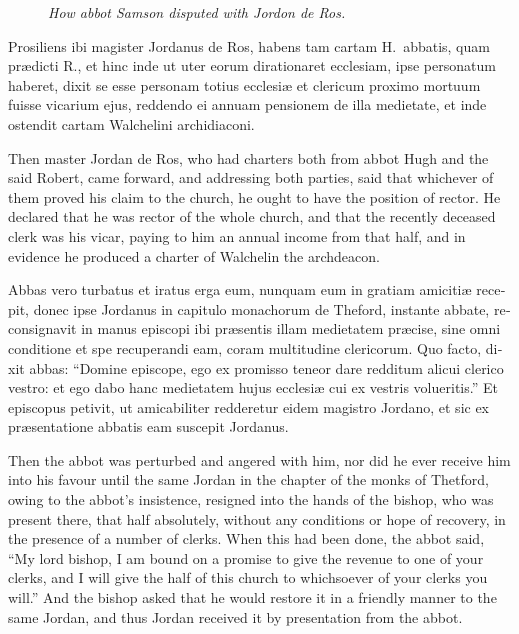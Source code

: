 \documentclass{book}
\newcommand{\blockhead}[4][]{
\begin{figure}
\centering
\vspace{#4}
\parbox{2.75cm}{\begin{center}\footnotesize \color{BrickRed} \emph{#2}\\ #1 \end{center}}
\end{figure}
}
\begin{document}
\begin{paracol}{2}
\switchcolumn*

\begin{otherlanguage}{latin}
\blockhead{How abbot Samson disputed with Jordon de Ros.}{4}{-.45cm}
Prosiliens ibi magister Jordanus de Ros, habens tam cartam H.\ abbatis, quam pr\ae{}dicti R., et hinc inde ut uter eorum dirationaret ecclesiam, ipse personatum haberet, dixit se esse personam totius ecclesi\ae{} et clericum proximo mortuum fuisse vicarium ejus, reddendo ei annuam pensionem de illa medietate, et inde ostendit cartam Walchelini archidiaconi.

\end{otherlanguage}

\switchcolumn

Then master Jordan de Ros, who had charters both from abbot Hugh and the said Robert, came forward, and addressing both parties, said that whichever of them proved his claim to the church, he ought to have the position of rector. He declared that he was rector of the whole church, and that the recently deceased clerk was his vicar, paying to him an annual income from that half, and in evidence he produced a charter of Walchelin the archdeacon.

\switchcolumn*

\begin{otherlanguage}{latin}
Abbas vero turbatus et iratus erga eum, nunquam eum in gratiam amiciti\ae{} recepit, donec ipse Jordanus in capitulo monachorum de Theford, instante abbate, reconsignavit in manus episcopi ibi pr\ae{}sentis illam medietatem pr\ae{}cise, sine omni conditione et spe recuperandi eam, coram multitudine clericorum. Quo facto, dixit abbas: ``Domine episcope, ego ex promisso teneor dare redditum alicui clerico vestro: et ego dabo hanc medietatem hujus ecclesi\ae{} cui ex vestris volueritis.'' Et episcopus petivit, ut amicabiliter redderetur eidem magistro Jordano, et sic ex pr\ae{}sentatione abbatis eam suscepit Jordanus.
\end{otherlanguage}

\switchcolumn

Then the abbot was perturbed and angered with him, nor did he ever receive him into his favour until the same Jordan in the chapter of the monks of Thetford, owing to the abbot's insistence, resigned into the hands of the bishop, who was present there, that half absolutely, without any conditions or hope of recovery, in the presence of a number of clerks. When this had been done, the abbot said, ``My lord bishop, I am bound on a promise to give the revenue to one of your clerks, and I will give the half of this church to whichsoever of your clerks you will.'' And the bishop asked that he would restore it in a friendly manner to the same Jordan, and thus Jordan received it by presentation from the abbot.


\end{paracol}
\end{document}

